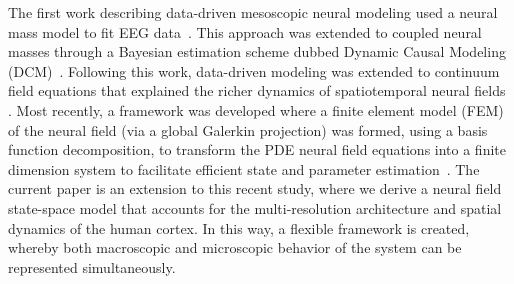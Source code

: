 \documentclass[journal]{IEEEtran}
\begin{document}
The first work describing data-driven mesoscopic neural modeling used a neural mass model to fit EEG data~\cite{Valdes1999}. This approach was extended to coupled neural masses through a Bayesian estimation scheme dubbed Dynamic Causal Modeling (DCM)~\cite{David2003}. Following this work, data-driven modeling was extended to continuum field equations that explained the richer dynamics of spatiotemporal neural fields \cite{Galka2008,schiff2008kalman,Daunizeau2009}. Most recently, a framework was developed where a finite element model (FEM) of the neural field (via a global Galerkin projection) was formed, using a basis function decomposition, to transform the PDE neural field equations into a finite dimension system to facilitate efficient state and parameter estimation~\cite{Freestone2011}. The current paper is an extension to this recent study, where we derive a neural field state-space model that accounts for the multi-resolution architecture and spatial dynamics of the human cortex. In this way, a flexible framework is created, whereby both macroscopic and microscopic behavior of the system can be represented simultaneously.
\end{document}

